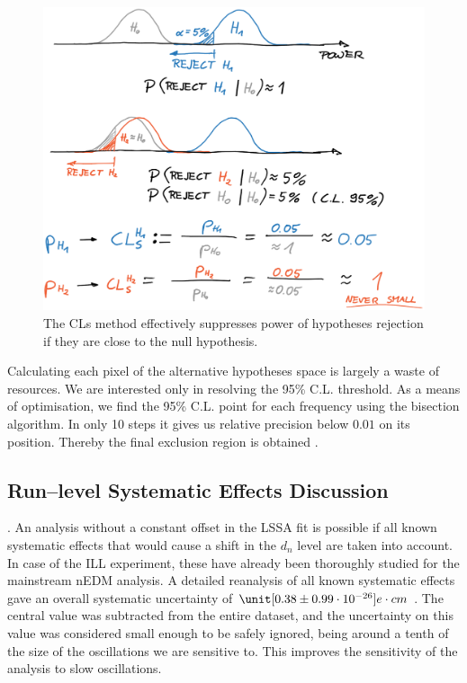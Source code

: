 \begin{figure}[htb]
  \centering \includegraphics[width=\linewidth]{gfx/axions/CLs.png}
  \caption{The CLs method effectively suppresses power of hypotheses rejection if they are close to the null hypothesis.}
  \label{fig:CLs}
\end{figure}

Calculating each pixel of the alternative hypotheses space is largely a waste of resources. We are interested only in resolving the 95\% C.L. threshold. As a means of optimisation, we find the 95\% C.L. point for each frequency using the bisection algorithm. In only 10 steps it gives us relative precision below $0.01$ on its position. Thereby the final exclusion region is obtained .


\subsection{Run--level Systematic Effects Discussion}
. An analysis without a constant offset in the LSSA fit is possible if all known systematic effects that would cause a shift in the $d_n$ level are taken into account. In case of the ILL experiment, these have already been thoroughly studied for the mainstream nEDM analysis. A detailed reanalysis of all known systematic effects gave an overall systematic uncertainty of $\unit[0.38 \pm 0.99 \cdot 10^{-26}]{e\cdot cm}$ \cite{Pendlebury2015}. The central value was subtracted from the entire dataset, and the uncertainty on this value was considered small enough to be safely ignored, being around a tenth of the size of the oscillations we are sensitive to. This improves the sensitivity of the analysis to slow oscillations.  

